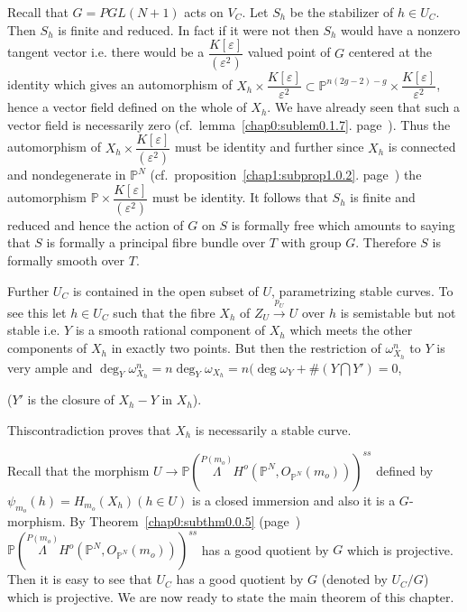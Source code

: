 Recall that $G =  PGL (N + 1)$ acts on $V_C$. Let $S_h$ be the
stabilizer of $h \in U_C$. Then $S_h$ is finite and
reduced. In fact if it were not then $S_h$ would have a nonzero
tangent vector i.e. there would be a $\dfrac{K[\varepsilon]}{
  (\varepsilon^2)}$ valued point of $G$ centered at the identity
which gives an automorphism of $ X_h \times
\dfrac{K[\varepsilon]}{\varepsilon^2} \subset \mathbb{P}^{n (2g -2)-g}
\times \dfrac{K[\varepsilon]}{\varepsilon^2}$, hence a vector field
defined on the whole of $X_h$. We have already seen that such a vector
field is necessarily zero (cf.\ lemma~\ref{chap0:sublem0.1.7}. 
page~\pageref{chap0:sublem0.1.7}). Thus the 
automorphism of $X_h \times \dfrac{K[\varepsilon]}{(\varepsilon^2)}$
must be identity and further since $X_h$ is connected and
nondegenerate in $\mathbb{P}^N$ (cf.\ 
proposition~\ref{chap1:subprop1.0.2}. 
page~\pageref{chap1:subprop1.0.2}) 
the automorphism $\mathbb{P} \times
\dfrac{K[\varepsilon]}{(\varepsilon^2)}$ must be identity. It follows
that $S_h$ is finite and reduced and hence the action of $G$ on $S$ is
formally free which amounts to saying that $S$ is formally a principal
fibre bundle over $T$ with group $G$. Therefore $S$  is formally
smooth over $T$. 

Further $U_C$ is contained in the open subset of $U$, parametrizing
stable curves. To see this let $h \in U_C$ such that the fibre
$X_h$ of $Z_U \xrightarrow{p_U} U$ over $h$ is semistable but not
stable i.e. $Y$ is a smooth rational component of $X_h$ which meets
the other components of $X_h$ in exactly two points. But then the
restriction of $\omega^n_{X_h}$ to $Y$ is very ample and $\deg_Y
\omega^n_{X_h} = n \deg_Y \omega_{X_h } = n (\deg \omega_Y + \# (Y
\bigcap Y' ) = 0$, 

\noindent
($Y'$ is the closure of $X_h - Y$ in $X_h$).
 
 \noindent
  This\pageoriginale  contradiction proves that $X_h$ is necessarily a
  stable curve.  

Recall that the morphism $U \to \mathbb{P} (\overset{P(m_o)}{\Lambda}
H^o (\mathbb{P}^N, O_{\mathbb{P}^N} (m_o)))^{ss}$ defined by
$\psi_{m_o} (h) = H_{m_o}(X_h) (h \in  U)$ is a closed
immersion and also it is a $G$-morphism. By 
Theorem~\ref{chap0:subthm0.0.5} (page~\pageref{chap0:subthm0.0.5}) 
$\mathbb{P} (\overset{P(m_o)}{\Lambda} H^o (\mathbb{P}^N,
O_{\mathbb{P}^N} (m_o)))^{ss}$ has a good quotient by $G$ which is
projective. Then it is easy to see that $U_C$ has a good quotient by
$G$ (denoted by $U_C/G$) which is projective. We are now ready to
state the main theorem of this chapter. 

